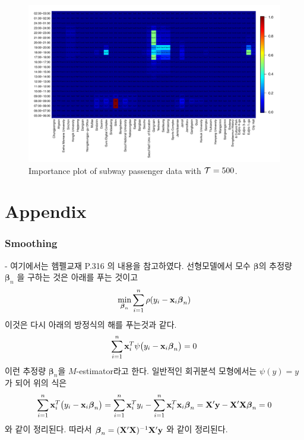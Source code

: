 \documentclass[preprint, review, 12pt]{article}
\theoremstyle{definition}
\theoremstyle{remark}
\begin{document}
\begin{figure}
	\centering
	\includegraphics[width=1.05\textwidth]{Fig/In_scale_6.pdf}
	\vspace{-13mm}
	\caption{Importance plot of subway passenger data with ${\cal T}=500$.}
	\label{snow:subway_in_5}
\end{figure}	


\section*{Appendix}
\subsubsection*{Smoothing}

- 여기에서는 헴펠교재 P.316 의 내용을 참고하였다. 선형모델에서 모수 $\boldsymbol{\beta}$의 추정량 $\boldsymbol{\beta}_ n$ 을 구하는 것은 아래를 푸는 것이고 
\begin{align}
\min_{\boldsymbol{\beta}_ n}\sum_{i=1}^{n}\rho(y_i-{\bf x}_ i \boldsymbol{\beta}_ n)
\end{align}
이것은 다시 아래의 방정식의 해를 푸는것과 같다. 
\begin{align}
\sum_{i=1}^{n}{\bf x}_ i^T\psi\big(y_i-{\bf x}_ i \boldsymbol{\beta}_ n\big)=0 
\end{align}
이런 추정량 $\boldsymbol{\beta}_ n$을 $M$-estimator라고 한다. 일반적인 회귀분석 모형에서는 $\psi(y)=y$ 가 되어 위의 식은 
\begin{align}
\sum_{i=1}^{n}{\bf x}_ i^T\big(y_i-{\bf x}_ i \boldsymbol{\beta}_ n\big)=\sum_{i=1}^{n}{\bf x}_ i^T y_i-\sum_{i=1}^{n}{\bf x}_ i^T {\bf x}_ i \boldsymbol{\beta}_ n= {\bf X}'{\bf y}-{\bf X}'{\bf X}\boldsymbol{\beta}_ n=0 
\end{align}
와 같이 정리된다. 따라서 $\boldsymbol{\beta}_ n = ({\bf X}'{\bf X})^{-1}{\bf X}'{\bf y}$ 와 같이 정리된다.
\end{document}
